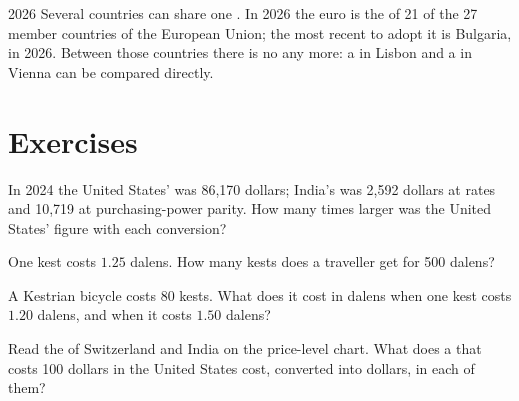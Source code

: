 \begin{dated}{2026}
Several countries can share one . In 2026 the euro is the  of 21 of the 27 member countries
of the European Union; the most recent to adopt it is Bulgaria, in 2026. Between those countries there is
no  any more: a  in Lisbon and a  in Vienna can be compared directly.
\end{dated}

\section{Exercises}

\begin{exercise}[$\star$]\label{exo:g9:exchange-rates-and-purchasing-power:1}
In 2024 the United States'  was 86,170 dollars; India's was 2,592 dollars at  rates and
10,719 at purchasing-power parity. How many times larger was the United States' figure with each
conversion?
\end{exercise}

\begin{exercise}[$\star$]\label{exo:g9:exchange-rates-and-purchasing-power:2}
One kest costs $1.25$ dalens. How many kests does a traveller get for 500 dalens?
\end{exercise}

\begin{exercise}[$\star$]\label{exo:g9:exchange-rates-and-purchasing-power:3}
A Kestrian bicycle costs 80 kests. What does it cost in dalens when one kest costs $1.20$ dalens, and when
it costs $1.50$ dalens?
\end{exercise}

\begin{exercise}[$\star$]\label{exo:g9:exchange-rates-and-purchasing-power:4}
Read the  of Switzerland and India on the price-level chart. What does a  that costs 100
dollars in the United States cost, converted into dollars, in each of them?
\end{exercise}

